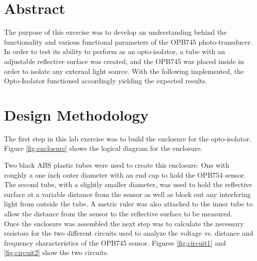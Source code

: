 \documentclass[CMPE]{KGCOEReport}
\begin{document}
\maketitle

\renewcommand\cftsecleader{\cftdotfill{\cftdotsep}} %
\tableofcontents
\newpage
\setcounter{secnumdepth}{0} %
\renewcommand\um{$\mu$m} %
\newcommand\ua{$\mu$a }
\newcommand{\ol}[1]{\overline{#1}}

\section{Abstract}
The purpose of this exercise was to develop an understanding behind the 
functionality and various functional parameters of the OPB745 
photo-transducer. In order to test its ability to perform as an opto-isolator,
a tube with an adjustable reflective surface was created, and the OPB745 was placed inside in order to isolate any 
external light source. With the following implemented, the Opto-Isolator 
functioned accordingly yielding the expected results. 


\section{Design Methodology}
The first step in this lab exercise was to build the enclosure for the opto-isolator. 
Figure \ref{fig:enclosure} shows the logical diagram for the enclosure. 


Two black ABS plastic tubes were used to create this enclosure. One with roughly a 
one inch outer diameter with an end cap to hold the OPB754 sensor. The second 
tube, with a slightly smaller diameter, was used to hold the reflective surface
at a variable distance from the sensor as well as block out any interfering light from outside
the tube. A metric ruler was also attached to the inner tube to allow the distance from the
sensor to the reflective surface to be measured.\\

Once the enclosure was assembled the next step was to calculate the necessary 
resistors for the two different circuits used to analyze the voltage vs. distance
and frequency characteristics of the OPB745 sensor. Figures \ref{fig:circuit1} and 
\ref{fig:circuit2} show the two circuits. 
\end{document}
